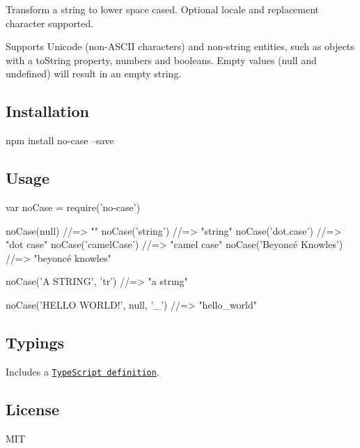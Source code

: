 \href{https://npmjs.org/package/no-case}{\tt } \href{https://npmjs.org/package/no-case}{\tt } \href{https://travis-ci.org/blakeembrey/no-case}{\tt } \href{https://coveralls.io/r/blakeembrey/no-case?branch=master}{\tt }

Transform a string to lower space cased. Optional locale and replacement character supported.

Supports Unicode (non-\/\+A\+S\+C\+II characters) and non-\/string entities, such as objects with a {\ttfamily to\+String} property, numbers and booleans. Empty values ({\ttfamily null} and {\ttfamily undefined}) will result in an empty string.

\subsection*{Installation}


\begin{DoxyCode}
npm install no-case --save
\end{DoxyCode}


\subsection*{Usage}


\begin{DoxyCode}
var noCase = require('no-case')

noCase(null)              //=> ""
noCase('string')          //=> "string"
noCase('dot.case')        //=> "dot case"
noCase('camelCase')       //=> "camel case"
noCase('Beyoncé Knowles') //=> "beyoncé knowles"

noCase('A STRING', 'tr') //=> "a strıng"

noCase('HELLO WORLD!', null, '\_') //=> "hello\_world"
\end{DoxyCode}


\subsection*{Typings}

Includes a \href{no-case.d.ts}{\tt Type\+Script definition}.

\subsection*{License}

M\+IT 